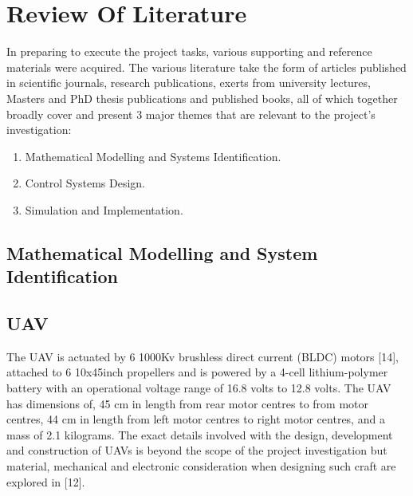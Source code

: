\documentclass[12pt,a4paper,twoside]{report}
\begin{document}
	\newpage
	
	\section{Review Of Literature }	
	
		In preparing to execute the project tasks, various supporting and reference materials were acquired. The various literature take the form of articles published in scientific journals, research publications, exerts from university lectures, Masters and PhD thesis publications and published books, all of which together broadly cover and present 3 major themes that are relevant to the project’s investigation:
		
		\begin{enumerate}
			\item 
				Mathematical Modelling and Systems Identification. 
			\item 
				Control Systems Design.
			\item 
				Simulation and Implementation.
		\end{enumerate}
	
		\newpage
		
		\subsection{Mathematical Modelling and System Identification}
			
			\subsection*{UAV}
				
				The UAV is actuated by 6 1000Kv brushless direct current (BLDC) motors [14], attached to 6 10x45inch propellers and is powered by a 4-cell lithium-polymer battery with an operational voltage range of 16.8 volts to 12.8 volts. The UAV has dimensions of, 45 cm in length from rear motor centres to from motor centres, 44 cm in length from left motor centres to right motor centres, and a mass of 2.1 kilograms. The exact details involved with the design, development and construction of UAVs is beyond the scope of the project investigation but material, mechanical and electronic consideration when designing such craft are explored in [12].
				
\end{document}
